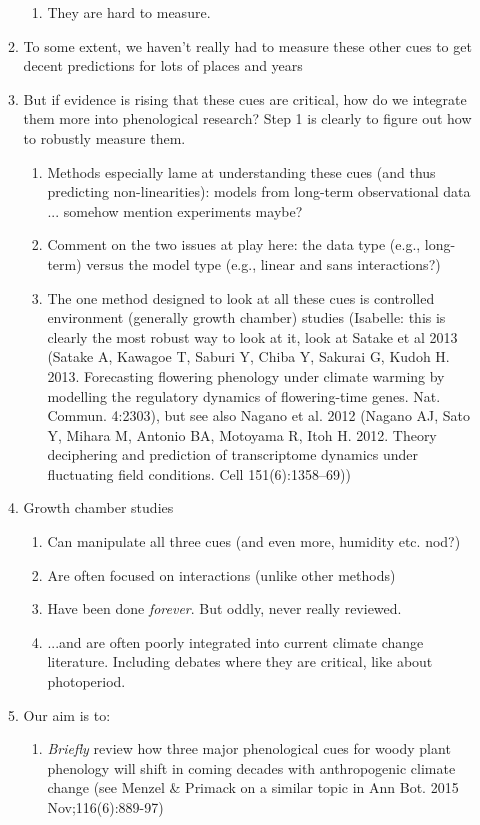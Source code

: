 \documentclass[11pt,letterpaper]{article}
\begin{document}
\begin{enumerate}
\begin{enumerate}
\begin{enumerate}
\item They are hard to measure.
\end{enumerate}
\item To some extent, we haven't really had to measure these other cues to get decent predictions for lots of places and years
\item But if evidence is rising that these cues are critical, how do we integrate them more into phenological research? Step 1 is clearly to figure out how to robustly measure them. 
\begin{enumerate}
\item Methods especially lame at understanding these cues (and thus predicting non-linearities): models from long-term observational data ... somehow mention experiments maybe?
\item Comment on the two issues at play here: the data type (e.g., long-term) versus the model type (e.g., linear and sans interactions?)
\item The one method designed to look at all these cues is controlled environment (generally growth chamber) studies (Isabelle: this is clearly the most robust way to look at it, look at Satake et al 2013 (Satake A, Kawagoe T, Saburi Y, Chiba Y, Sakurai G, Kudoh H. 2013. Forecasting flowering phenology under climate warming by modelling the regulatory dynamics of flowering-time genes. Nat. Commun. 4:2303), but see also  Nagano et al. 2012 (Nagano AJ, Sato Y, Mihara M, Antonio BA, Motoyama R, Itoh H. 2012. Theory deciphering and prediction of transcriptome dynamics under fluctuating field conditions. Cell 151(6):1358–69))
\end{enumerate}
\item Growth chamber studies
\begin{enumerate}
\item Can manipulate all three cues (and even more, humidity etc. nod?)
\item Are often focused on interactions (unlike other methods)
\item Have been done \emph{forever}. But oddly, never really reviewed.
\item  ...and are often poorly integrated into current climate change literature. Including debates where they are critical, like about photoperiod. 
\end{enumerate}
\item Our aim is to:
\begin{enumerate}
\item \emph{Briefly} review how three major phenological cues for woody plant phenology will shift in coming decades with anthropogenic climate change (see Menzel \& Primack on a similar topic in Ann Bot. 2015 Nov;116(6):889-97)

\end{enumerate}
\end{enumerate}
\end{enumerate}
\end{document}
